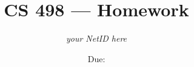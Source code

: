 \documentclass{article}
\title{CS 498 --- Homework \hwno}
\author{\emph{your NetID here}}
\date{Due: \duedate }
\begin{document}
\maketitle


\begin{enumerate}

  

  

\end{enumerate}
\end{document}
